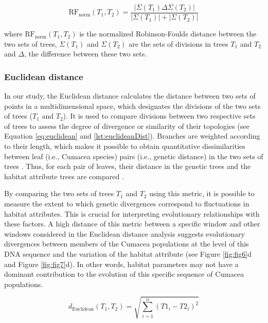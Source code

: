 {\begin{equation}\label{eq:rf_norm}
    \text{RF}_{\text{norm}}(T_1, T_2) = \frac{| \Sigma(T_1) \Delta \Sigma(T_2) |}{| \Sigma(T_1) | + | \Sigma(T_2) |}
\end{equation}

where $ \text{RF}_{\text{norm}}(T_1, T_2)$ is the normalized Robinson-Foulds distance between the two sets of trees, $\Sigma(T_1)$ and $\Sigma(T_2)$ are the sets of divisions in trees $T_1$ and $T_2$ and $ \Delta $, the difference between these two sets.

\subsubsection{Euclidean distance}\label{euclidean}
In our study, the Euclidean distance calculates the distance between two sets of points in a multidimensional space, which designates the divisions of the two sets of trees ($T_1$ and $T_2$). It is used to compare divisions between two respective sets of trees to assess the degree of divergence or similarity of their topologies (see Equation \eqref{eq:euclidean} and \autoref{lst:euclideanDist}). Branches are weighted according to their length, which makes it possible to obtain quantitative dissimilarities between leaf (i.e., Cumacea species) pairs (i.e., genetic distance) in the two sets of trees \citep{choi2009comparison}. Thus, for each pair of leaves, their distance in the genetic trees and the habitat attribute trees are compared \citep{choi2009comparison}.

By comparing the two sets of trees $T_1$ and $T_2$ using this metric, it is possible to measure the extent to which genetic divergences correspond to fluctuations in habitat attributes. This is crucial for interpreting evolutionary relationships with these factors. A high distance of this metric between a specific window and other windows considered in the Euclidean distance analysis suggests evolutionary divergences between members of the Cumacea populations at the level of this DNA sequence and the variation of the habitat attribute (see Figure \ref{fig:fig6}d and Figure \ref{fig:fig7}d). In other words, habitat parameters may not have a dominant contribution to the evolution of this specific sequence of Cumacea populations.

\begin{equation}\label{eq:euclidean}
    d_{\text{Euclidean}}(T_1, T_2) = \sqrt{\sum_{i=1}^{n} (T1_i - T2_i)^2}
\end{equation}

}
